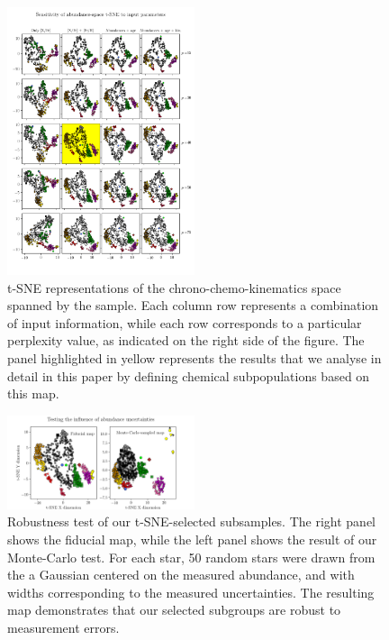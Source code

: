 \documentclass{aa}  %
\begin{document}
\begin{figure}\centering
 \includegraphics[width=0.49\textwidth]{im/harps-tSNE_perplexitytest_withsubsets.png}
\caption{t-SNE representations of the chrono-chemo-kinematics space spanned by the \citet{DelgadoMena2017} sample. Each column row represents a combination of input information, while each row corresponds to a particular perplexity value, as indicated on the right side of the figure. The panel highlighted in yellow represents the results that we analyse in detail in this paper by defining chemical subpopulations based on this map.}
\label{perplexitytest2}
\end{figure}

\begin{figure}\centering
 \includegraphics[width=0.49\textwidth]{im/harps_tsne-mctest_teffcut.png}
\caption{Robustness test of our t-SNE-selected subsamples. The right panel shows the fiducial map, while the left panel shows the result of our Monte-Carlo test. For each star, 50 random stars were drawn from the a Gaussian centered on the measured abundance, and with widths corresponding to the measured uncertainties. The resulting map demonstrates that our selected subgroups are robust to measurement errors.}
\label{harps2}
\end{figure}
\end{document}
